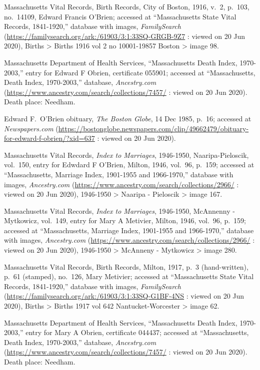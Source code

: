 \begin{thebibliography}{999}
	Massachusetts Vital Records, Birth Records, City of Boston, 1916, v.\ 2, p.\ 103, no.\ 14109, Edward Francis O'Brien; accessed at ``Massachusetts State Vital Records, 1841-1920,'' database with images, \textit{FamilySearch} (\url{https://familysearch.org/ark:/61903/3:1:33SQ-GRGB-9Z7} : viewed on 20 Jun 2020), Births > Births 1916 vol 2 no 10001-19857 Boston > image 98.
	
	Massachusetts Department of Health Services, ``Massachusetts Death Index, 1970-2003,'' entry for Edward F Obrien, certificate 055901; accessed at ``Massachusetts, Death Index, 1970-2003,'' database, \textit{Ancestry.com} (\url{https://www.ancestry.com/search/collections/7457/} : viewed on 20 Jun 2020).\\
	Death place: Needham.
	
	Edward F.\ O'Brien obituary, \textit{The Boston Globe}, 14 Dec 1985, p.\ 16; accessed at \textit{Newspapers.com} (\url{https://bostonglobe.newspapers.com/clip/49662479/obituary-for-edward-f-obrien/?xid=637} : viewed on 20 Jun 2020).
	
	Massachusetts Vital Records, \textit{Index to Marriages}, 1946-1950, Naaripa-Pieloscik, vol.\ 150, entry for Edwdard F O'Brien, Milton, 1946, vol.\ 96, p.\ 159; accessed at ``Massachusetts, Marriage Index, 1901-1955 and 1966-1970,'' database with images, \textit{Ancestry.com} (\url{https://www.ancestry.com/search/collections/2966/} : viewed on 20 Jun 2020), 1946-1950 > Naaripa - Pieloscik > image 167.
	
	Massachusetts Vital Records, \textit{Index to Marriages}, 1946-1950, McAnnenny - Mytkowicz, vol.\ 149, entry for Mary A Metivier, Milton, 1946, vol.\ 96, p.\ 159; accessed at ``Massachusetts, Marriage Index, 1901-1955 and 1966-1970,'' database with images, \textit{Ancestry.com} (\url{https://www.ancestry.com/search/collections/2966/} : viewed on 20 Jun 2020), 1946-1950 > McAnneny - Mytkowicz > image 280.
	
	Massachusetts Vital Records, Birth Records, Milton, 1917, p.\ 3 (hand-written), p.\ 61 (stamped), no.\ 126, Mary Metivier; accessed at ``Massachusetts State Vital Records, 1841-1920,'' database with images, \textit{FamilySearch} (\url{https://familysearch.org/ark:/61903/3:1:33SQ-G1BF-4NS} : viewed on 20 Jun 2020), Births > Births 1917 vol 642 Nantucket-Worcester > image 62.
	
	Massachusetts Department of Health Services, ``Massachusetts Death Index, 1970-2003,'' entry for Mary A Obrien, certificate 044437; accessed at ``Massachusetts, Death Index, 1970-2003,'' database, \textit{Ancestry.com} (\url{https://www.ancestry.com/search/collections/7457/} : viewed on 20 Jun 2020).\\
	Death place: Needham.
	

\end{thebibliography}
